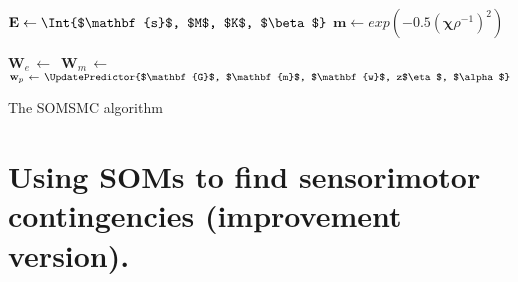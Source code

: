 \documentclass[a4paper]{article}
\begin{document}
\begin{algorithm}[H]
{{    	\BlankLine
	
        $\mathbf{E}\leftarrow\Int{$\mathbf{s}$, $M$, $K$, $\beta$}$\;
		$\mathbf{m} \leftarrow exp(-0.5(\boldsymbol{\chi}\rho^{-1})^2)$\;
        
        \BlankLine
        
        $\mathbf{W}_e\,\leftarrow$\,\;
        $\mathbf{W}_m\,\leftarrow$\,\;
        $\mathbf{w}_p\,\leftarrow\,\UpdatePredictor{$\mathbf{G}$, 
        	$\mathbf{m}$, $\mathbf{w}$, z$\eta$, $\alpha$}$\;

    	\BlankLine
	
    }
}

\caption{The SOMSMC algorithm}\label{smc1}
\end{algorithm}
\DecMargin{1em}

\pagebreak
\section*{Using SOMs to find sensorimotor contingencies (improvement version).}
\end{document}
